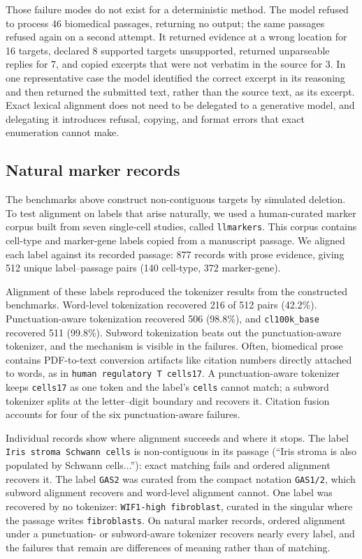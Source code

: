 \documentclass[10pt,twocolumn]{article}
\theoremstyle{plain}
\theoremstyle{definition}
\theoremstyle{remark}
\begin{document}
Those failure modes do not exist for a deterministic method. The model refused to process 46 biomedical passages, returning no output; the same passages refused again on a second attempt. It returned evidence at a wrong location for 16 targets, declared 8 supported targets unsupported, returned unparseable replies for 7, and copied excerpts that were not verbatim in the source for 3. In one representative case the model identified the correct excerpt in its reasoning and then returned the submitted text, rather than the source text, as its excerpt. Exact lexical alignment does not need to be delegated to a generative model, and delegating it introduces refusal, copying, and format errors that exact enumeration cannot make.

\subsection{Natural marker records}
The benchmarks above construct non-contiguous targets by simulated deletion. To test alignment on labels that arise naturally, we used a human-curated marker corpus built from seven single-cell studies, called \texttt{llmarkers}. This corpus contains cell-type and marker-gene labels copied from a manuscript passage. We aligned each label against its recorded passage: 877 records with prose evidence, giving 512 unique label--passage pairs (140 cell-type, 372 marker-gene).

Alignment of these labels reproduced the tokenizer results from the constructed benchmarks. Word-level tokenization recovered 216 of 512 pairs (42.2\%). Punctuation-aware tokenization recovered 506 (98.8\%), and \texttt{cl100k\_base} recovered 511 (99.8\%). Subword tokenization beats out the punctuation-aware tokenizer, and the mechanism is visible in the failures. Often, biomedical prose contains PDF-to-text conversion artifacts like citation numbers directly attached to words, as in \texttt{human regulatory T cells17}. A punctuation-aware tokenizer keeps \texttt{cells17} as one token and the label's \texttt{cells} cannot match; a subword tokenizer splits at the letter--digit boundary and recovers it. Citation fusion accounts for four of the six punctuation-aware failures.

Individual records show where alignment succeeds and where it stops. The label \texttt{Iris stroma Schwann cells} is non-contiguous in its passage (``Iris stroma is also populated by Schwann cells...''): exact matching fails and ordered alignment recovers it. The label \texttt{GAS2} was curated from the compact notation \texttt{GAS1/2}, which subword alignment recovers and word-level alignment cannot. One label was recovered by no tokenizer: \texttt{WIF1-high fibroblast}, curated in the singular where the passage writes \texttt{fibroblasts}. On natural marker records, ordered alignment under a punctuation- or subword-aware tokenizer recovers nearly every label, and the failures that remain are differences of meaning rather than of matching.
\end{document}
